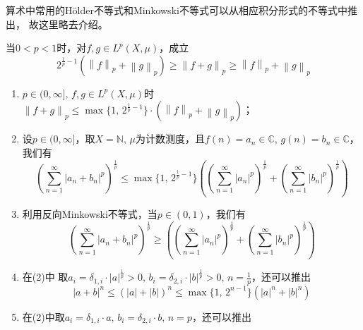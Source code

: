 \documentclass[color=green,thmcnt=section,lang=cn,12pt]{elegantbook}
\numberwithin{equation}{section}%
\numberwithin{figure}{section}%
\newcommand{\CC}{\mathbb{C}}
\newcommand{\NN}{\mathbb{N}}
\newcommand{\holder}{\textrm{Hölder}}
\begin{document}
算术中常用的\holder 不等式和Minkowski不等式可以从相应积分形式的不等式中推出，
故这里略去介绍。


\begin{theorem}[反向Minkowski不等式]\label{fanxiangminkowskibudengshi}
    当$0<p< 1$时，对$f,g\in L^p(X,\mu)$，成立\begin{equation*}
     2^{\frac{1}{p}-1}\left( \left\lVert f  \right\rVert _p  + \left\lVert g  \right\rVert _p \right) \geq \left\lVert f+g  \right\rVert _p  \geq \left\lVert f  \right\rVert _p +\left\lVert g  \right\rVert _p
    \end{equation*}
\end{theorem}

\begin{corollary}\label{Minkowskituilun}
  \begin{enumerate}
     \item $p\in (0, \infty],\,f,g\in L^p(X,\mu)$时
        $\left\lVert f+g  \right\rVert _p \leq \max\{1,\,2^{\frac{1}{p}-1}\} \cdot \left( \left\lVert f  \right\rVert _p+\left\lVert g  \right\rVert _p \right) $；
     \item 设$p\in (0, \infty]$，取$X=\NN,\,\mu$为计数测度，且$f(n)=a_n\in \CC,\,g(n)=b_n\in \CC$，我们有
     \begin{equation*}
        \left( \sum_{n=1}^\infty |a_n+b_n|^p \right) ^\frac{1}{p} \leq \max\{1,\,2^{\frac{1}{p}-1}\}\left(\left(\sum_{n=1}^\infty \left|a_n\right| ^p\right)^\frac{1}{p}+\left(\sum_{n=1}^\infty \left|b_n\right| ^p \right)^\frac{1}{p}\right)
     \end{equation*}
     \item 利用反向Minkowski不等式，当$p\in (0,1)$，我们有
     \begin{equation*}
        \left( \sum_{n=1}^\infty |a_n+b_n|^p \right) ^\frac{1}{p} \geq \left(\left(\sum_{n=1}^\infty \left|a_n\right| ^p\right)^\frac{1}{p}+\left(\sum_{n=1}^\infty \left|b_n\right| ^p \right)^\frac{1}{p}\right)
     \end{equation*}
     \item 在(2)中 取$a_i=\delta_{1,i}\cdot |a|^{\frac{1}{p}}>0,\,b_i=\delta_{2,i}\cdot |b|^{\frac{1}{p}}>0,\,n=\frac{1}{p}$，还可以推出
     \begin{equation*}
       |a+b|^n\leq  (|a|+|b|)^n \leq \max\{1,\,2^{n-1}\}\left(  |a|^{n}+|b|^n \right)
     \end{equation*}
     \item 在(2)中取$a_i=\delta_{1,i}\cdot a,\,b_i=\delta_{2,i}\cdot b,\,n=p$，还可以推出

\end{enumerate}
\end{corollary}
\end{document}
